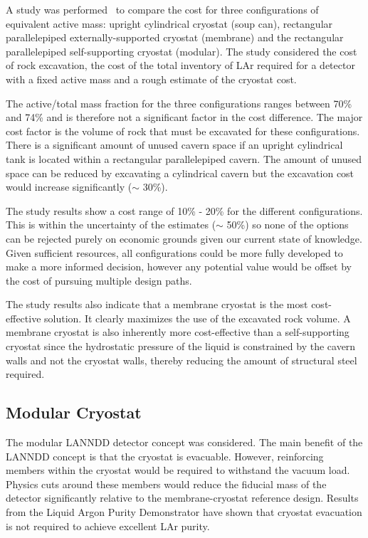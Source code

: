 A study was performed~\cite{docdb355} to compare the cost for three configurations of equivalent active mass: upright cylindrical cryostat (soup can), rectangular parallelepiped externally-supported cryostat (membrane) and the rectangular parallelepiped self-supporting cryostat (modular). The study considered the cost of rock excavation, the cost of the total inventory of LAr required for a detector with a fixed active mass and a rough estimate of the cryostat cost. 

The active/total mass fraction for the three configurations ranges between 70\% and 74\% and is therefore not a significant factor in the cost difference. The major cost factor is the volume of rock that must be excavated for these configurations. There is a significant amount of unused cavern space if an upright cylindrical tank is located within a rectangular parallelepiped cavern. The amount of unused space can be reduced by excavating a cylindrical cavern but the excavation cost would increase significantly ($\sim$ 30\%).

The study results show a cost range of 10\% - 20\% for the different configurations. This is within the uncertainty of the estimates ($\sim$ 50\%) so none of the options can be rejected purely on economic grounds given our current state of knowledge. Given sufficient resources, all configurations could be more fully developed to make a more informed decision, however any potential value would be offset by the cost of pursuing multiple design paths. 

The study results also indicate that a membrane cryostat is the most cost-effective solution. It clearly maximizes the use of the excavated rock volume. A membrane cryostat is also inherently more cost-effective than a self-supporting cryostat since the hydrostatic pressure of the liquid is constrained by the cavern walls and not the cryostat walls, thereby reducing the amount of structural steel required.

\subsection{Modular Cryostat}

The modular LANNDD detector %
concept was considered. %
The main benefit of the LANNDD concept is that the cryostat is evacuable. However, reinforcing members within the cryostat would be required to withstand the vacuum load. Physics cuts around these members would reduce the fiducial mass of the detector significantly relative to the membrane-cryostat reference design. Results from the Liquid Argon Purity Demonstrator %
have shown that cryostat evacuation is not required to achieve excellent LAr purity.

